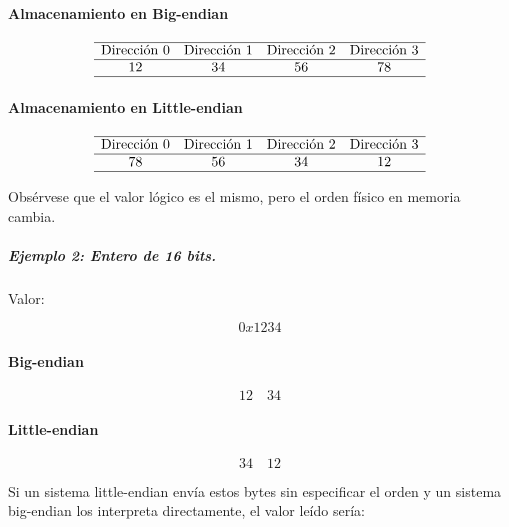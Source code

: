 \documentclass[12pt,twoside]{book}
\begin{document}
						\paragraph{Almacenamiento en Big-endian}
						
						\[
						\begin{array}{c c c c }
							\hline
							\text{Dirección 0} & \text{Dirección 1} & \text{Dirección 2} & \text{Dirección 3} \\
							\hline
							12 & 34 & 56 & 78 \\
							\hline
						\end{array}
						\]
						
						\paragraph{Almacenamiento en Little-endian}
						
						\[
						\begin{array}{ c c c c }
							\hline
							\text{Dirección 0} & \text{Dirección 1} & \text{Dirección 2} & \text{Dirección 3} \\
							\hline
							78 & 56 & 34 & 12 \\
							\hline
						\end{array}
						\]
						
						Obsérvese que el valor lógico es el mismo, pero el orden físico en memoria cambia.
						
						
						\subparagraph{Ejemplo 2: Entero de 16 bits.} Valor:
						
						\[
						0x1234
						\]
						
						\paragraph{Big-endian}
						
						\[
						12 \quad 34
						\]
						
						\paragraph{Little-endian}
						
						\[
						34 \quad 12
						\]
						
						Si un sistema little-endian envía estos bytes sin especificar el orden y un sistema big-endian los interpreta directamente, el valor leído sería:
						
\end{document}
